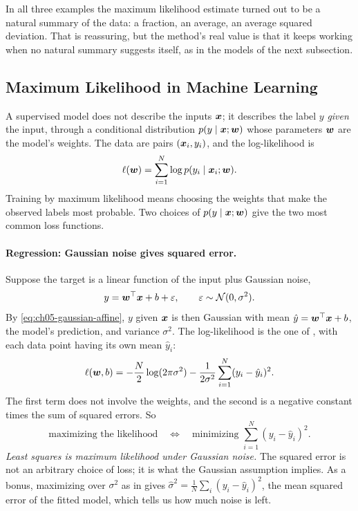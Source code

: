 In all three examples the maximum likelihood estimate turned out to be
a natural summary of the data: a fraction, an average, an average squared
deviation. That is reassuring, but the method's real value is that it
keeps working when no natural summary suggests itself, as in the models
of the next subsection.

\subsection{Maximum Likelihood in Machine Learning}
\label{sec:ch06-mle-ml}

A supervised model does not describe the inputs $\bm{x}$; it
describes the label $y$ \emph{given} the input, through a conditional
distribution $p(y \mid \bm{x}; \bm{w})$ whose parameters $\bm{w}$
are the model's weights. The data are pairs $(\bm{x}_i, y_i)$, and the
log-likelihood is
\[
  \ell(\bm{w}) = \sum_{i=1}^{N} \log p(y_i \mid \bm{x}_i; \bm{w}) .
\]
Training by maximum likelihood means choosing the weights that make the
observed labels most probable. Two choices of $p(y \mid \bm{x};
\bm{w})$ give the two most common loss functions.

\paragraph{Regression: Gaussian noise gives squared error.}
Suppose the target is a linear function of the input plus Gaussian
noise,
\[
  y = \bm{w}^\top\bm{x} + b + \varepsilon,
  \qquad \varepsilon \sim \mathcal{N}(0, \sigma^2) .
\]
By \cref{eq:ch05-gaussian-affine}, $y$ given $\bm{x}$ is then
Gaussian with mean $\hat{y} = \bm{w}^\top\bm{x} + b$, the model's
prediction, and variance $\sigma^2$. The log-likelihood is the one of
, with each data point having its own mean
$\hat{y}_i$:
\[
  \ell(\bm{w}, b) = -\frac{N}{2}\log(2\pi\sigma^2)
    - \frac{1}{2\sigma^2}\sum_{i=1}^{N} (y_i - \hat{y}_i)^2 .
\]
The first term does not involve the weights, and the second is a
negative constant times the sum of squared errors. So
\[
  \text{maximizing the likelihood}
  \quad\Longleftrightarrow\quad
  \text{minimizing } \sum_{i=1}^{N} (y_i - \hat{y}_i)^2 .
\]
\emph{Least squares is maximum likelihood under Gaussian noise.} The
squared error is not an arbitrary choice of loss; it is what the
Gaussian assumption implies. As a bonus, maximizing over $\sigma^2$ as
in  gives $\hat\sigma^2 = \frac1N\sum_i (y_i
- \hat{y}_i)^2$, the mean squared error of the fitted model, which tells
us how much noise is left.

